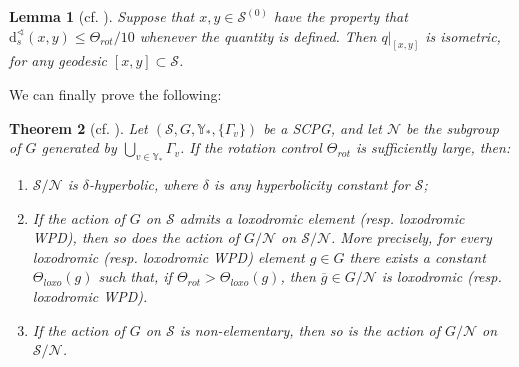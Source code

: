 \documentclass[svgnames]{amsart}
\theoremstyle{plain}
\newtheorem{thm}{Theorem}[section]
\newtheorem{lemma}[thm]{Lemma}
\theoremstyle{definition}
\newcommand{\ov}[1]{\overline{#1}}
\newcommand{\dist}{\mathrm{d}}
\newcommand{\N}{\mathcal{N}}
\newcommand{\calS}{\mathcal{S}}
\renewcommand{\angle}{\sphericalangle}
\begin{document}
\begin{lemma}[{cf. \cite[Lemma 4.4]{dfdt}}]\label{lem:isom_proj}
    Suppose that $x,y\in\calS^{(0)}$ have the property that $\dist^\angle_s(x,y)\le \Theta_{rot}/10$ whenever the quantity is defined. Then $q|_{[x,y]}$ is isometric, for any geodesic $[x, y]\subset\calS$.
\end{lemma} 
We can finally prove the following:

\begin{thm}[{cf. \cite[Theorem 2.1]{dfdt}}]\label{thm:rotating}
    Let $(\mathcal S, G, \mathbb{Y}_*,  \{\Gamma_v\})$ be a SCPG, and let $\N$ be the subgroup of $G$ generated by $\bigcup_{v\in \mathbb{Y}_*}\Gamma_v$. If the rotation control $\Theta_{rot}$ is sufficiently large, then:
    \begin{enumerate}
        \item\label{item_hyp} $\mathcal S/\N$ is $\delta$-hyperbolic, where $\delta$ is any hyperbolicity constant for $\mathcal S$;
        \item If the action of $G$ on $\mathcal S$ admits a loxodromic element (resp. loxodromic WPD), then so does the action of $G/\N$ on $\mathcal S/\N$. More precisely, for every loxodromic (resp. loxodromic WPD) element $g\in G$ there exists a constant $\Theta_{loxo}(g)$ such that, if $\Theta_{rot}>\Theta_{loxo}(g)$, then $\ov g\in G/\N$ is loxodromic (resp. loxodromic WPD).
        \item\label{item:nonelm} If the action of $G$ on $\mathcal S$ is non-elementary, then so is the action of $G/\N$ on $\mathcal S/\N$.
    \end{enumerate}
\end{thm}
\end{document}
